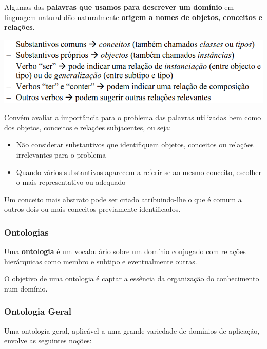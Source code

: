 \documentclass{article}
\begin{document}
\vspace{2mm}

Algumas das \textbf{palavras que usamos para descrever um domínio} em
linguagem natural dão naturalmente \textbf{origem a nomes de objetos,
conceitos e relações}.

\begin{center}
  \includegraphics[scale=0.4]{44}
\end{center}

Convém avaliar a importância para o problema das palavras utilizadas
bem como dos objetos, conceitos e relações subjacentes, ou seja:
\begin{itemize}
  \item Não considerar substantivos que identifiquem objetos, conceitos ou
  relações irrelevantes para o problema
  \item Quando vários substantivos aparecem a referir-se ao mesmo conceito,
  escolher o mais representativo ou adequado
\end{itemize}

\pagebreak

Um conceito mais abstrato pode ser criado atribuindo-lhe o que
é comum a outros dois ou mais conceitos previamente
identificados.

\subsubsection{Ontologias}

Uma \textbf{ontologia} é um \uline{vocabulário sobre um domínio}
conjugado com relações hierárquicas como \uline{membro} e
\uline{subtipo} e eventualmente outras.

O objetivo de uma ontologia é captar a essência da organização do conhecimento
num domínio.

\subsubsection{Ontologia Geral}

Uma ontologia geral, aplicável a uma grande variedade
de domínios de aplicação, envolve as seguintes noções:
\end{document}
